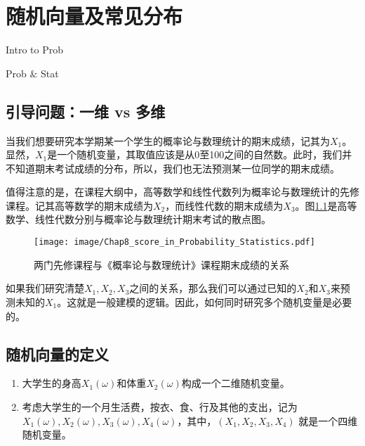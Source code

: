 \chapter{随机向量及常见分布}
\begin{introduction}
  \item Intro to Prob  
  \item Prob $\&$ Stat
\end{introduction}

\section{引导问题：一维 vs 多维}

当我们想要研究本学期某一个学生的概率论与数理统计的期末成绩，记其为$X_1$。显然，$X_1$是一个随机变量，其取值应该是从0至100之间的自然数。此时，我们并不知道期末考试成绩的分布，所以，我们也无法预测某一位同学的期末成绩。

值得注意的是，在课程大纲中，高等数学和线性代数列为概率论与数理统计的先修课程。记其高等数学的期末成绩为$X_2$，而线性代数的期末成绩为$X_3$。图\ref{fig:chap08_score_in_Probability_Statistics}是高等数学、线性代数分别与概率论与数理统计期末考试的散点图。

\begin{figure}[ht]
    \centering
    \texttt{[image: image/Chap8\_score\_in\_Probability\_Statistics.pdf]}
    \caption{两门先修课程与《概率论与数理统计》课程期末成绩的关系}
    \label{fig:chap08_score_in_Probability_Statistics}
\end{figure}

如果我们研究清楚$X_1,X_2,X_3$之间的关系，那么我们可以通过已知的$X_2$和$X_3$来预测未知的$X_1$。这就是一般建模的逻辑。因此，如何同时研究多个随机变量是必要的。


\section{随机向量的定义}
\begin{example}
\begin{enumerate}
    \item 大学生的身高$X_{1}(\omega)$和体重$X_{2}(\omega)$构成一个二维随机变量。
    \item 考虑大学生的一个月生活费，按衣、食、行及其他的支出，记为$X_{1}(\omega),X_{2}(\omega),X_{3}(\omega),X_{4}(\omega)$，其中，$\left(X_{1}, X_{2}, X_{3}, X_{4}\right)$ 就是一个四维随机变量。
\end{enumerate}
\end{example}

